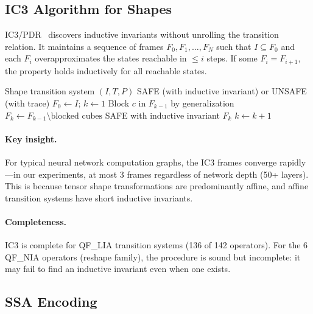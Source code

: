 \documentclass[10pt]{article}
\theoremstyle{plain}
\theoremstyle{definition}
\theoremstyle{remark}
\begin{document}
\subsection{IC3 Algorithm for Shapes}

IC3/PDR~\cite{bradley11,een11} discovers inductive invariants
without unrolling the transition relation.  It maintains a sequence
of frames $F_0, F_1, \ldots, F_N$ such that $I \subseteq F_0$ and
each $F_i$ overapproximates the states reachable in $\leq i$ steps.
If some $F_i = F_{i+1}$, the property holds inductively for all
reachable states.

\begin{algorithm}[t]
\caption{IC3/PDR for parametric shape safety}
\label{alg:ic3}
\begin{algorithmic}[1]
\Require Shape transition system $(I, T, P)$
\Ensure SAFE (with inductive invariant) or UNSAFE (with trace)
\State $F_0 \gets I$; $k \gets 1$
\Loop
    \State Block $c$ in $F_{k-1}$ by generalization
  \EndWhile
  \State $F_k \gets F_{k-1} \setminus \text{blocked cubes}$
    \Return SAFE with inductive invariant $F_k$
  \EndIf
  \State $k \gets k + 1$
\EndLoop
\end{algorithmic}
\end{algorithm}

\paragraph{Key insight.}
For typical neural network computation graphs, the IC3 frames
converge rapidly---in our experiments, at most 3 frames regardless
of network depth (50+ layers).  This is because tensor shape
transformations are predominantly affine, and affine transition
systems have short inductive invariants.

\paragraph{Completeness.}
IC3 is complete for QF\_LIA transition systems (136 of 142
operators).  For the 6 QF\_NIA operators (reshape family), the
procedure is sound but incomplete: it may fail to find an inductive
invariant even when one exists.

\subsection{SSA Encoding}\label{sec:ssa}
\end{document}
